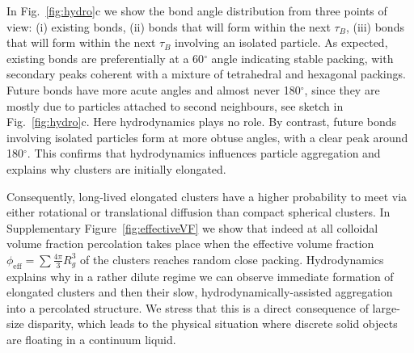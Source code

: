 \documentclass[preprint,footinbib,amsmath,amssymb]{revtex4}
\begin{document}
In Fig.~\ref{fig:hydro}c we show the bond angle distribution from three points of view: (i) existing bonds, (ii) bonds that will form within the next $\tau_B$, (iii) bonds that will form within the next $\tau_B$ involving an isolated particle. As expected, existing bonds are preferentially at a 60$^\circ$ angle indicating stable packing, with secondary peaks coherent with a mixture of tetrahedral and hexagonal packings. Future bonds have more acute angles and almost never 180$^\circ$, since they are mostly due to particles attached to second neighbours, see sketch in Fig.~\ref{fig:hydro}c. Here hydrodynamics plays no role. By contrast, future bonds involving isolated particles form at more obtuse angles, with a clear peak around 180$^\circ$. This confirms that hydrodynamics influences particle aggregation and explains why clusters are initially elongated.

Consequently, long-lived elongated clusters have a higher probability to meet via either rotational or translational diffusion than compact spherical clusters. In Supplementary Figure~\ref{fig:effectiveVF} we show that indeed at all colloidal volume fraction percolation takes place when the effective volume fraction $\phi_\text{eff} = \sum\frac{4\pi}{3}R_g^3$ of the clusters reaches random close packing. Hydrodynamics explains why in a rather dilute regime we can observe immediate formation of elongated clusters and then their slow, hydrodynamically-assisted aggregation into a percolated structure.
We stress that this is a direct consequence of large-size disparity, which leads to the physical situation where discrete solid objects are floating in a continuum liquid. 
\end{document}
